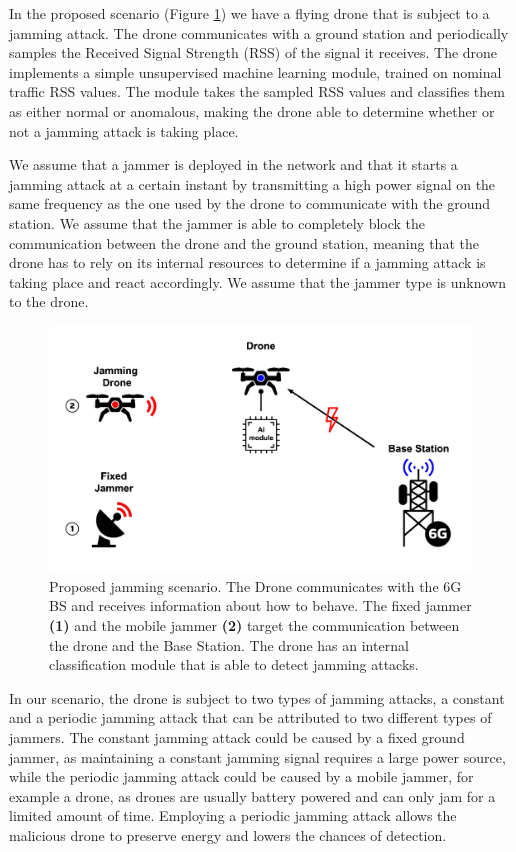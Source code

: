 \documentclass[futureinternet,article,submit,pdftex,moreauthors]{Definitions/mdpi}
\begin{document}
In the proposed scenario (Figure \ref{fig:CombinedJammingscenariosDiagram}) we have a flying drone that is subject to a jamming attack. The drone communicates with a ground station and periodically samples the Received Signal Strength (RSS) of the signal it receives. 
The drone implements a simple unsupervised machine learning module, trained on nominal traffic RSS values. The module takes the sampled RSS values and classifies them as either normal or anomalous, making the drone able to determine whether or not a jamming attack is taking place. 


We assume that a jammer is deployed in the network and that it starts a jamming attack at a certain instant by transmitting a high power signal on the same frequency as the one used by the drone to communicate with the ground station.
We assume that the jammer is able to completely block the communication between the drone and the ground station, meaning that the drone has to rely on its internal resources to determine if a jamming attack is taking place and react accordingly.
We assume that the jammer type is unknown to the drone. 


\begin{figure}[H]
	\includegraphics[width=10.5 cm]{img/CombinedJammingscenariosDiagram.jpg}
	\centering
	\caption{Proposed jamming scenario. The Drone communicates with the 6G BS and receives information about how to behave. The fixed jammer \textbf{(1)} and the mobile jammer \textbf{(2)} target the communication between the drone and the Base Station. The drone has an internal classification module that is able to detect jamming attacks.}
	\label{fig:CombinedJammingscenariosDiagram}
	\end{figure}   


In our scenario, the drone is subject to two types of jamming attacks, a constant and a periodic jamming attack that can be attributed to two different types of jammers. The constant jamming attack could be caused by a fixed ground jammer, as maintaining a constant jamming signal requires a large power source, while 
the periodic jamming attack could be caused by a mobile jammer, for example a drone, as drones are usually battery powered and can only jam for a limited amount of time. 
Employing a periodic jamming attack allows the malicious drone to preserve energy and lowers the chances of detection.
\end{document}
